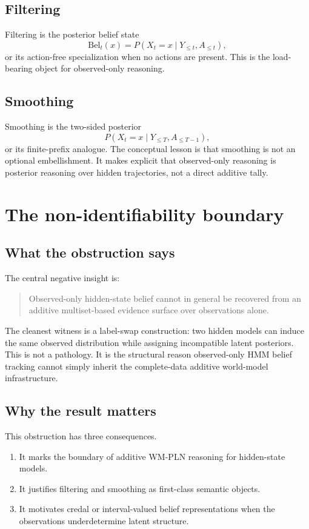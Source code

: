\documentclass[11pt]{article}
\newcommand{\wmpln}{WM-PLN}
\newcommand{\Bel}{\mathrm{Bel}}
\begin{document}
\subsection{Filtering}

Filtering is the posterior belief state
\[
\Bel_t(x) = P(X_t=x \mid Y_{\le t}, A_{\le t}),
\]
or its action-free specialization when no actions are present.  This is the
load-bearing object for observed-only reasoning.

\subsection{Smoothing}

Smoothing is the two-sided posterior
\[
P(X_t=x \mid Y_{\le T}, A_{\le T-1}),
\]
or its finite-prefix analogue.  The conceptual lesson is that smoothing is not
an optional embellishment.  It makes explicit that observed-only reasoning is
posterior reasoning over hidden trajectories, not a direct additive tally.

\section{The non-identifiability boundary}

\subsection{What the obstruction says}

The central negative insight is:
\begin{quote}
Observed-only hidden-state belief cannot in general be recovered from an
additive multiset-based evidence surface over observations alone.
\end{quote}

The cleanest witness is a label-swap construction: two hidden models can induce
the same observed distribution while assigning incompatible latent posteriors.
This is not a pathology.  It is the structural reason observed-only HMM belief
tracking cannot simply inherit the complete-data additive world-model
infrastructure.

\subsection{Why the result matters}

This obstruction has three consequences.
\begin{enumerate}
  \item It marks the boundary of additive \wmpln{} reasoning for hidden-state
        models.
  \item It justifies filtering and smoothing as first-class semantic objects.
  \item It motivates credal or interval-valued belief representations when the
        observations underdetermine latent structure.
\end{enumerate}
\end{document}
